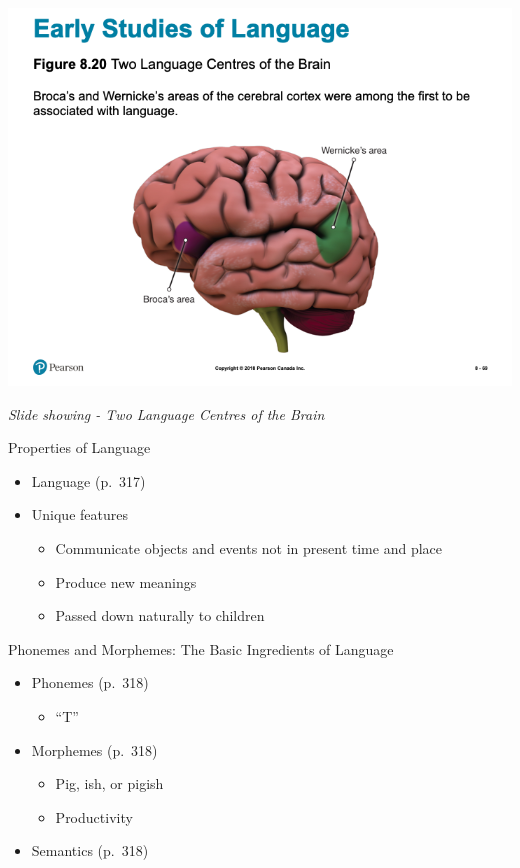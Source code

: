 \documentclass[
]{book}
\providecommand{\tightlist}{%
  \setlength{\itemsep}{0pt}\setlength{\parskip}{0pt}}
\begin{document}
\includegraphics{assets/unit_1/slide_69.png}

\emph{Slide showing - Two Language Centres of the Brain}

Properties of Language

\begin{itemize}
\tightlist
\item
  Language (p.~317)\\
\item
  Unique features

  \begin{itemize}
  \tightlist
  \item
    Communicate objects and events not in present time and place\\
  \item
    Produce new meanings\\
  \item
    Passed down naturally to children
  \end{itemize}
\end{itemize}

Phonemes and Morphemes: The Basic Ingredients of Language

\begin{itemize}
\tightlist
\item
  Phonemes (p.~318)

  \begin{itemize}
  \tightlist
  \item
    ``T''
  \end{itemize}
\item
  Morphemes (p.~318)

  \begin{itemize}
  \tightlist
  \item
    Pig, ish, or pigish\\
  \item
    Productivity\\
  \end{itemize}
\item
  Semantics (p.~318)
\end{itemize}
\end{document}
